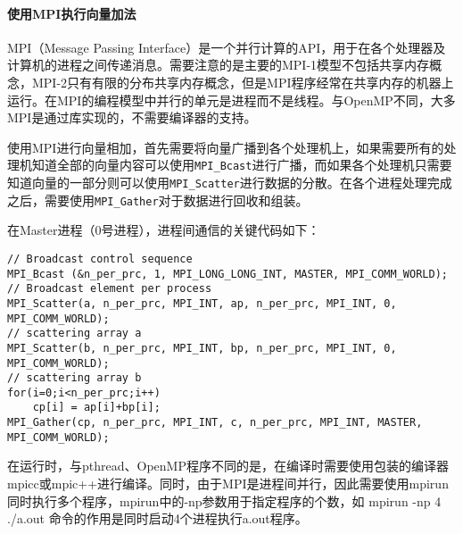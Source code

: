 \paragraph{使用MPI执行向量加法}
\label{par:shi_yong_mpizhi_xing_xiang_liang_jia_fa_}
\par MPI（Message Passing Interface）是一个并行计算的API，用于在各个处理器及计算机的进程之间传递消息。需要注意的是主要的MPI-1模型不包括共享内存概念，MPI-2只有有限的分布共享内存概念，但是MPI程序经常在共享内存的机器上运行。在MPI的编程模型中并行的单元是进程而不是线程。与OpenMP不同，大多MPI是通过库实现的，不需要编译器的支持。
\par 使用MPI进行向量相加，首先需要将向量广播到各个处理机上，如果需要所有的处理机知道全部的向量内容可以使用\lstinline{MPI_Bcast}进行广播，而如果各个处理机只需要知道向量的一部分则可以使用\lstinline{MPI_Scatter}进行数据的分散。在各个进程处理完成之后，需要使用\lstinline{MPI_Gather}对于数据进行回收和组装。
\par 在Master进程（0号进程），进程间通信的关键代码如下：
\begin{lstlisting}
// Broadcast control sequence
MPI_Bcast (&n_per_prc, 1, MPI_LONG_LONG_INT, MASTER, MPI_COMM_WORLD);
// Broadcast element per process
MPI_Scatter(a, n_per_prc, MPI_INT, ap, n_per_prc, MPI_INT, 0, MPI_COMM_WORLD);
// scattering array a
MPI_Scatter(b, n_per_prc, MPI_INT, bp, n_per_prc, MPI_INT, 0, MPI_COMM_WORLD);
// scattering array b
for(i=0;i<n_per_prc;i++)
	cp[i] = ap[i]+bp[i];
MPI_Gather(cp, n_per_prc, MPI_INT, c, n_per_prc, MPI_INT, MASTER, MPI_COMM_WORLD);
\end{lstlisting}
\par 在运行时，与pthread、OpenMP程序不同的是，在编译时需要使用包装的编译器mpicc或mpic++进行编译。同时，由于MPI是进程间并行，因此需要使用mpirun同时执行多个程序，mpirun中的-np参数用于指定程序的个数，如 mpirun -np 4 ./a.out 命令的作用是同时启动4个进程执行a.out程序。

